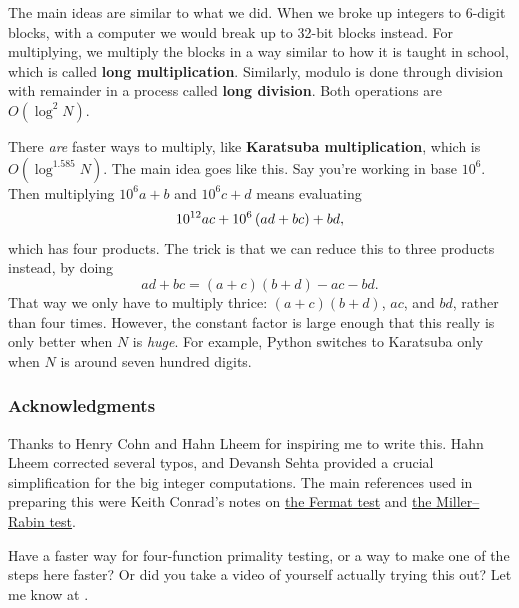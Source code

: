 \documentclass[11pt,paper=letter]{scrartcl}
\begin{document}
The main ideas are similar to what we did. When we broke up integers to 6-digit blocks, with a computer we would break up to 32-bit blocks instead. For multiplying, we multiply the blocks in a way similar to how it is taught in school, which is called \textbf{long multiplication}. Similarly, modulo is done through division with remainder in a process called \textbf{long division}. Both operations are $O(\log^2 N)$.

There \emph{are} faster ways to multiply, like \textbf{Karatsuba multiplication}, which is $O(\log^{1.585} N)$. The main idea goes like this. Say you're working in base $10^6$. Then multiplying $10^6 a + b$ and $10^6 c + d$ means evaluating
$$10^{12} ac + 10^6 \left( ad + bc \right) + bd,$$
which has four products. The trick is that we can reduce this to three products instead, by doing
$$ad + bc = (a + c)(b + d) - ac - bd.$$
That way we only have to multiply thrice: $(a + c)(b + d)$, $ac$, and $bd$, rather than four times. However, the constant factor is large enough that this really is only better when $N$ is \emph{huge}. For example, Python switches to Karatsuba only when $N$ is around seven hundred digits.

\subsubsection*{Acknowledgments}

Thanks to Henry Cohn and Hahn Lheem for inspiring me to write this. Hahn Lheem corrected several typos, and Devansh Sehta provided a crucial simplification for the big integer computations. The main references used in preparing this were Keith Conrad's notes on \href{https://kconrad.math.uconn.edu/blurbs/ugradnumthy/fermattest.pdf}{the Fermat test} and \href{https://kconrad.math.uconn.edu/blurbs/ugradnumthy/millerrabin.pdf}{the Miller--Rabin test}. 

Have a faster way for four-function primality testing, or a way to make one of the steps here faster? Or did you take a video of yourself actually trying this out? Let me know at .
\end{document}
